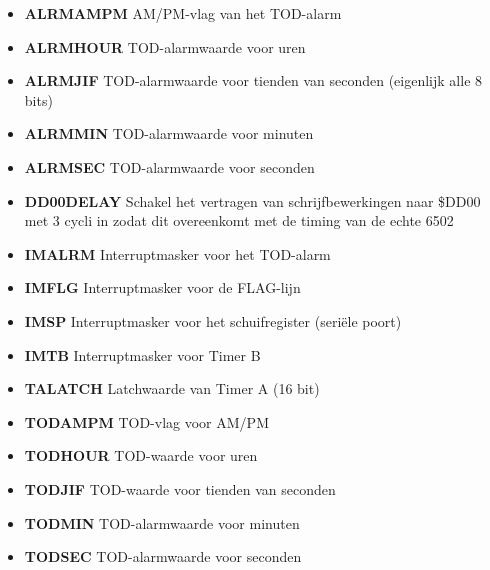 \begin{itemize}
\item{\bf{ALRMAMPM}} AM/PM-vlag van het TOD-alarm
\item{\bf{ALRMHOUR}} TOD-alarmwaarde voor uren
\item{\bf{ALRMJIF}} TOD-alarmwaarde voor tienden van seconden (eigenlijk alle 8 bits)
\item{\bf{ALRMMIN}} TOD-alarmwaarde voor minuten
\item{\bf{ALRMSEC}} TOD-alarmwaarde voor seconden
\item{\bf{DD00DELAY}} Schakel het vertragen van schrijfbewerkingen naar \$DD00 met 3 cycli in zodat dit overeenkomt met de timing van de echte 6502
\item{\bf{IMALRM}} Interruptmasker voor het TOD-alarm
\item{\bf{IMFLG}} Interruptmasker voor de FLAG-lijn
\item{\bf{IMSP}} Interruptmasker voor het schuifregister (seriële poort)
\item{\bf{IMTB}} Interruptmasker voor Timer B
\item{\bf{TALATCH}} Latchwaarde van Timer A (16 bit)
\item{\bf{TODAMPM}} TOD-vlag voor AM/PM
\item{\bf{TODHOUR}} TOD-waarde voor uren
\item{\bf{TODJIF}} TOD-waarde voor tienden van seconden
\item{\bf{TODMIN}} TOD-alarmwaarde voor minuten
\item{\bf{TODSEC}} TOD-alarmwaarde voor seconden
\end{itemize}
